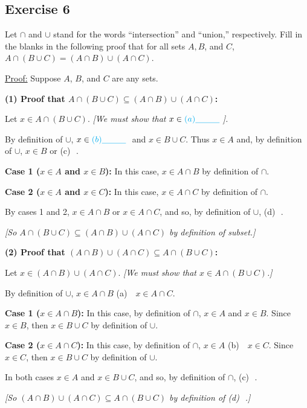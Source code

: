 \documentclass[14pt]{extarticle}
\newcommand{\fbl}{\underline{\hspace{1cm}}\,\,}
\newcommand{\cy}{\color{cyan}}
\begin{document}
\subsection{Exercise 6}
Let $\cap$ and $\cup$ stand for the words “intersection” and “union,” respectively. Fill in the blanks in the 
following proof that for all sets $A, B$, and $C$, \(A \cap (B \cup C) = (A \cap B) \cup (A \cap C)\).

\underline{Proof:} Suppose $A$, $B$, and $C$ are any sets.

{\bf (1) Proof that \(A \cap (B \cup C) \subseteq (A \cap B) \cup (A \cap C)\):}

Let \(x \in A \cap (B \cup C)\). {\it [We must show that \(x \in {\cy (a) \fbl}\)].}

By definition of $\cup$, \(x \in {\cy (b) \fbl}\) and \(x \in B \cup C\). 
Thus \(x \in A\) and, by definition of $\cup$, \(x \in B\) or {\cy (c) \fbl}.

{\bf Case 1 (\(x \in A\) and \(x \in B\)):} In this case, \(x \in A \cap B\) by definition of $\cap$.

{\bf Case 2 (\(x \in A\) and \(x \in C\)):} In this case, \(x \in A \cap C\) by definition of $\cap$.

By cases 1 and 2, \(x \in A \cap B\) or \(x \in A \cap C\), and so, by definition of $\cup$, {\cy (d) \fbl}.

{\it [So \(A \cap (B \cup C ) \subseteq (A \cap B) \cup (A \cap C)\) by definition of subset.]}

{\bf (2) Proof that \((A \cap B) \cup (A \cap C) \subseteq A \cap (B \cup C)\):}

Let \(x \in (A \cap B) \cup (A \cap C)\). {\it [We must show that \(x \in A \cap (B \cup C )\).]}

By definition of $\cup$, \(x \in A \cap B\) {\cy (a) \fbl} \(x \in A \cap C.\)

{\bf Case 1 (\(x \in A \cap B\)):} In this case, by definition of $\cap$, \(x \in A\) and \(x \in B\). Since 
\(x \in B\), then \(x \in B \cup C\) by definition of $\cup$.

{\bf Case 2 (\(x \in A \cap C\)):} In this case, by definition of $\cap$, \(x \in A\) {\cy (b) \fbl} 
\(x \in C\). Since \(x \in C\), then \(x \in B \cup C\) by definition of $\cup$.

In both cases \(x \in A\) and \(x \in B \cup C\), and so, by definition of $\cap$, {\cy (c) \fbl}.

{\it [So \((A \cap B) \cup (A \cap C) \subseteq A \cap (B \cup C)\) by definition of {\cy (d) \fbl}.]}
\end{document}
